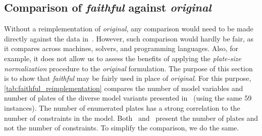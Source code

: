 \documentclass[smallextended]{svjour3}       %
\begin{document}
\begin{comment}
In \autoref{tab:lp_method_comparison}, \emph{Dual Simplex} and \emph{Barrier} indicate the respective algorithm was used for all LPs and root node relaxations;
and \emph{DS + B} means that \emph{Dual Simplex} was used to solve all LPs inside the pricing phase and \emph{Barrier} was used to solve the root node relaxation of the final model.
The columns \emph{N. P.} (\emph{Not Priced}) and \emph{Priced} display the time to solve (in seconds) using the aforementioned variant.
The columns \emph{R.\%} refer to the per cent of the time spent by \emph{Not Priced} in the root node relaxation of the final model.

The following conclusions can be derived from \autoref{tab:lp_method_comparison}.
Using the \emph{Barrier} algorithm in the pricing phase is not viable.
This impracticality happens because the pricing phase includes an iterative variable pricing phase.
This iterative phase repeatedly adds variables to one LP model and solve it again.
The \emph{Barrier} algorithm solves every LP from scratch;
the \emph{Dual Simplex} reuses the previous basis and saves considerable effort.
However, \emph{Barrier} performs better if there is no previous base to reuse.
Consequently, the configuration chosen was \emph{Dual Simplex} for the pricing phase, and \emph{Barrier} for the root relaxation of the final model.
\end{comment}

\subsection{Comparison of \emph{faithful} against \emph{original}}
\label{sec:faithful_reimplementation}

Without a reimplementation of \emph{original}, any comparison would need to be made directly against the data in~\cite{dimitri_thesis}.
However, such comparison would hardly be fair, as it compares across machines, solvers, and programming languages.
Also, for example, it does not allow us to assess the benefits of applying the \emph{plate-size normalization} procedure to the \emph{original} formulation.
The purpose of this section is to show that \emph{faithful} may be fairly used in place of \emph{original}.
For this purpose, \autoref{tab:faithful_reimplementation} compares the number of model variables and number of plates of the diverse model variants presented in~\cite{furini:2016,dimitri_thesis} (using the same 59 instances).
The number of enumerated plates has a strong correlation to the number of constraints in the model.
Both~\cite{furini:2016} and~\cite{dimitri_thesis} present the number of plates and not the number of constraints.
To simplify the comparison, we do the same.
\end{document}
